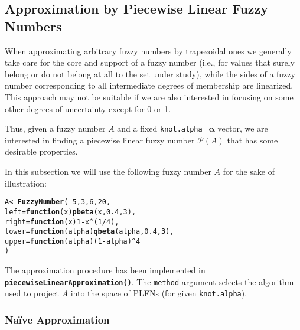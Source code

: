 \documentclass[11pt]{article}\usepackage[]{graphicx}\usepackage[]{color}
\makeatletter
\newcommand{\hlnum}[1]{\textcolor[rgb]{0.686,0.059,0.569}{#1}}%
\newcommand{\hlopt}[1]{\textcolor[rgb]{0,0,0}{#1}}%
\newcommand{\hlstd}[1]{\textcolor[rgb]{0.345,0.345,0.345}{#1}}%
\newcommand{\hlkwa}[1]{\textcolor[rgb]{0.161,0.373,0.58}{\textbf{#1}}}%
\newcommand{\hlkwb}[1]{\textcolor[rgb]{0.69,0.353,0.396}{#1}}%
\newcommand{\hlkwc}[1]{\textcolor[rgb]{0.333,0.667,0.333}{#1}}%
\newcommand{\hlkwd}[1]{\textcolor[rgb]{0.737,0.353,0.396}{\textbf{#1}}}%
\newenvironment{kframe}{%
 \def\at@end@of@kframe{}%
 \ifinner\ifhmode%
  \def\at@end@of@kframe{\end{minipage}}%
  \begin{minipage}{\columnwidth}%
 \fi\fi%
 \def\FrameCommand##1{\hskip\@totalleftmargin \hskip-\fboxsep
 \colorbox{shadecolor}{##1}\hskip-\fboxsep
     \hskip-\linewidth \hskip-\@totalleftmargin \hskip\columnwidth}%
 \MakeFramed {\advance\hsize-\width
   \@totalleftmargin\z@ \linewidth\hsize
   \@setminipage}}%
 {\par\unskip\endMakeFramed%
 \at@end@of@kframe}
\newenvironment{knitrout}{}{} %
\newcommand{\func}[1]{\texttt{\hlkwd{#1}}}
\newcommand{\argument}[1]{\texttt{\hlkwc{#1}}}
\makeatother
\begin{document}
\subsection{Approximation by Piecewise Linear Fuzzy Numbers}

When approximating arbitrary fuzzy numbers by trapezoidal ones we
generally take care for the core and support of a fuzzy number
(i.e., for values that surely belong or do not belong at all to the
set under study), while the sides of a fuzzy number corresponding
to all intermediate degrees of membership are linearized. This
approach may not be suitable if we are also interested in focusing
on some other degrees of uncertainty except for 0 or 1.

Thus, given a fuzzy number $A$ and a fixed
\argument{knot.alpha}=$\boldsymbol\alpha$ vector, we are interested in
finding a piecewise linear fuzzy number $\mathcal{P}(A)$
that has some desirable properties.

In this subsection we will use the following fuzzy number $A$
for the sake of illustration:

\begin{knitrout}\small
{}\color{fgcolor}\begin{kframe}
\begin{alltt}
\hlstd{A} \hlkwb{<-} \hlkwd{FuzzyNumber}\hlstd{(}\hlopt{-}\hlnum{5}\hlstd{,} \hlnum{3}\hlstd{,} \hlnum{6}\hlstd{,} \hlnum{20}\hlstd{,}
   \hlkwc{left}\hlstd{=}\hlkwa{function}\hlstd{(}\hlkwc{x}\hlstd{)} \hlkwd{pbeta}\hlstd{(x,}\hlnum{0.4}\hlstd{,}\hlnum{3}\hlstd{),}
   \hlkwc{right}\hlstd{=}\hlkwa{function}\hlstd{(}\hlkwc{x}\hlstd{)} \hlnum{1}\hlopt{-}\hlstd{x}\hlopt{^}\hlstd{(}\hlnum{1}\hlopt{/}\hlnum{4}\hlstd{),}
   \hlkwc{lower}\hlstd{=}\hlkwa{function}\hlstd{(}\hlkwc{alpha}\hlstd{)} \hlkwd{qbeta}\hlstd{(alpha,}\hlnum{0.4}\hlstd{,}\hlnum{3}\hlstd{),}
   \hlkwc{upper}\hlstd{=}\hlkwa{function}\hlstd{(}\hlkwc{alpha}\hlstd{) (}\hlnum{1}\hlopt{-}\hlstd{alpha)}\hlopt{^}\hlnum{4}
\hlstd{)}
\end{alltt}
\end{kframe}
\end{knitrout}


The approximation procedure has been implemented
in \func{piecewiseLinearApproximation()}.
The \argument{method} argument selects the algorithm used
to project $A$ into the space of PLFNs (for given \argument{knot.alpha}).

\subsubsection{Na\"{i}ve Approximation}
\end{document}
